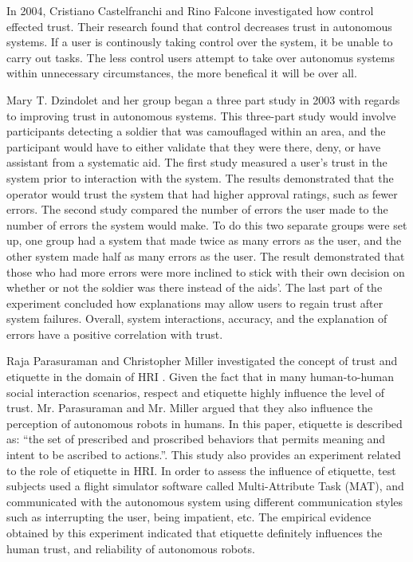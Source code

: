 \documentclass[runningheads,a4paper]{llncs}
\begin{document}
In 2004, Cristiano Castelfranchi and Rino Falcone investigated how control effected trust\cite{castelfranchi2000trust}.  Their research found that control decreases trust in autonomous systems.  If a user is continously taking control over the system, it be unable to carry out tasks.  The less control users attempt to take over autonomus systems within unnecessary circumstances, the more benefical it will be over all.

Mary T. Dzindolet and her group began a three part study in 2003  with regards to improving trust in autonomous systems\cite{dzindolet2003role}.  This three-part study would involve participants detecting a soldier that was camouflaged within an area, and the participant would have to either validate that they were there, deny, or have assistant from a systematic aid.  The first study measured a user's trust in the system prior to interaction with the system.  The results demonstrated that the operator would trust the system that had higher approval ratings, such as fewer errors.  The second study compared the number of errors the user made to the number of errors the system would make.  To do this two separate groups were set up,  one group had a system that made twice as many errors as the user, and the other system made half as many errors as the user.  The result demonstrated that those who had more errors were more inclined to stick with their own decision on whether or not the soldier was there instead of the aids'.  The last part of the experiment concluded how explanations may allow users to regain trust after system failures.   Overall, system interactions, accuracy, and the explanation of errors have a positive correlation with trust.

Raja Parasuraman and Christopher Miller investigated the concept of trust and etiquette in the domain of HRI \cite{parasuraman2004trust}. Given the fact that in many human-to-human social interaction scenarios, respect and etiquette highly influence the level of trust. Mr. Parasuraman and Mr. Miller argued that they also influence the perception of autonomous robots in humans. In this paper, etiquette is described as: ``the set of prescribed and proscribed behaviors
that permits meaning and intent to be ascribed to
actions.''. This study also provides an experiment related to the role of etiquette in HRI. In order to assess the influence of etiquette, test subjects used a flight simulator software called Multi-Attribute Task (MAT), and communicated with the autonomous system using different communication styles such as interrupting the user, being impatient, etc. The empirical evidence obtained by this experiment indicated that etiquette definitely influences the human trust, and reliability of autonomous robots.
\end{document}
